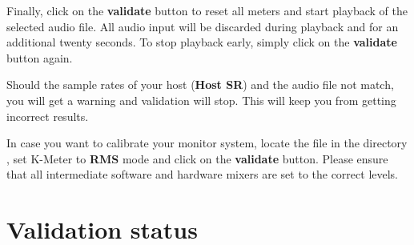 Finally, click on the \textbf{validate} button to reset all meters and
start playback of the selected audio file.  All audio input will be
discarded during playback and for an additional twenty seconds.  To
stop playback early, simply click on the \textbf{validate} button
again.

Should the sample rates of your host (\textbf{Host SR}) and the audio
file not match, you will get a warning and validation will stop.  This
will keep you from getting incorrect results.

In case you want to calibrate your monitor system, locate the file
 in the directory ,
set K-Meter to \textbf{RMS} mode and click on the \textbf{validate}
button.  Please ensure that all intermediate software and hardware
mixers are set to the correct levels.

\newpage %

\section{Validation status}

